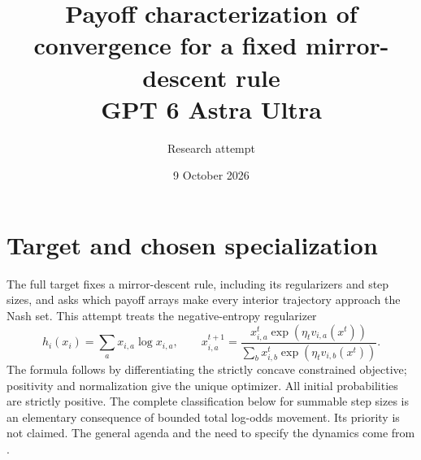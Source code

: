 \documentclass[11pt]{article}
\title{Payoff characterization of convergence for a fixed mirror-descent rule\\ GPT 6 Astra Ultra}
\author{Research attempt}
\date{9 October 2026}
\theoremstyle{definition}
\begin{document}
\maketitle

\section*{Target and chosen specialization}
The full target fixes a mirror-descent rule, including its regularizers and step sizes, and asks which payoff arrays make every interior trajectory approach the Nash set. This attempt treats the negative-entropy regularizer
\[
 h_i(x_i)=\sum_a x_{i,a}\log x_{i,a},\qquad
 x_{i,a}^{t+1}=\frac{x_{i,a}^t\exp(\eta_t v_{i,a}(x^t))}
 {\sum_b x_{i,b}^t\exp(\eta_t v_{i,b}(x^t))}.
\]
The formula follows by differentiating the strictly concave constrained objective; positivity and normalization give the unique optimizer. All initial probabilities are strictly positive. The complete classification below for summable step sizes is an elementary consequence of bounded total log-odds movement. Its priority is not claimed. The general agenda and the need to specify the dynamics come from \cite{potential}.
\end{document}
